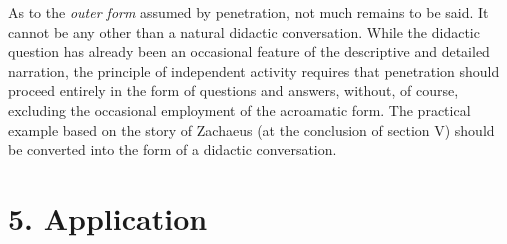 As to the \emph{outer form} assumed by penetration, not much remains to be said. It cannot be any other than a natural didactic conversation. While the didactic question has already been an occasional feature of the descriptive and detailed narration, the principle of independent activity requires that penetration should proceed entirely in the form of questions and answers, without, of course, excluding the occasional employment of the acroamatic form. The practical example based on the story of Zachaeus (at the conclusion of section V) should be converted into the form of a didactic conversation.

\section{5. Application}

